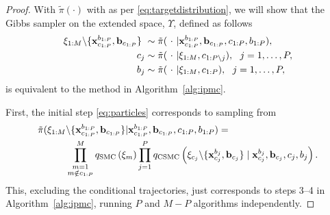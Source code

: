 \begin{proof}
	With $\tilde\pi(\cdot)$ with as per \eqref{eq:targetdistribution}, we will show that the Gibbs sampler on the extended space, $\Upsilon$, defined as follows	
	\begin{subequations}
		\label{eq:gibbs}
		\begin{align}
		\mathbf{\xi}_{1:M} \backslash\{\mathbf{x}_{c_{1:P}}^{b_{1:P}}, \mathbf{b}_{c_{1:P}} \} ~&\sim \tilde \pi(~\cdot~|\mathbf{x}_{c_{1:P}}^{b_{1:P}}, \mathbf{b}_{c_{1:P}},c_{1:P}, b_{1:P})\label{eq:particles},\\
		c_j &\sim \tilde \pi(~\cdot~|\mathbf{\xi}_{1:M}, c_{1:P\backslash j}), ~~j=1,\ldots,P,\label{eq:worker}\\
		b_j &\sim \tilde \pi(~\cdot~|\mathbf{\xi}_{1:M}, c_{1:P}), ~~j=1,\ldots,P,\label{eq:index}
		\end{align}
	\end{subequations}
	is equivalent to the \ipmcmc method in Algorithm~\ref{alg:ipmc}.
	
	First, the initial step \eqref{eq:particles} corresponds to sampling from
	\begin{align*}
	\tilde\pi(\mathbf{\xi}_{1:M} &\backslash\{\mathbf{x}_{c_{1:P}}^{b_{1:P}}, \mathbf{b}_{c_{1:P}} \} | \mathbf{x}_{c_{1:P}}^{b_{1:P}}, \mathbf{b}_{c_{1:P}},c_{1:P}, b_{1:P}) = \\ 
	& \prod_{\substack{m=1\\m\notin c_{1:P}}}^M q_{\text{SMC}}\left(\mathbf{\xi}_m\right) \prod_{j = 1}^P q_{\text{CSMC}}\left(\mathbf{\xi}_{c_j} \backslash \{\mathbf{x}_{c_j}^{b_j}, \mathbf{b}_{c_j}\} \mid \mathbf{x}_{c_j}^{b_j}, \mathbf{b}_{c_j}, c_j, b_j \right).
	\end{align*}
	This, excluding the conditional trajectories, just corresponds to steps 3--4 in Algorithm~\ref{alg:ipmc}, \ie running $P$ \csmc and $M-P$ \smc algorithms independently.
	

\end{proof}
